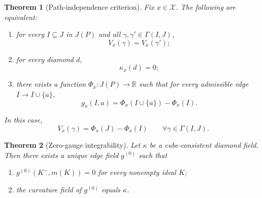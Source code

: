\documentclass[10pt,a4paper]{amsart}
\newtheorem{theorem}{Theorem}
\newcommand{\RR}{\mathbb R}
\begin{document}
\begin{theorem}[Path-independence criterion]
\label{thm:path-independence-main}
Fix \(x\in\mathcal X\). The following are equivalent:
\begin{enumerate}
    \item for every \(I\subseteq J\) in \(J(P)\) and all \(\gamma,\gamma'\in \Gamma(I,J)\),
    \begin{equation}
    V_x(\gamma)=V_x(\gamma');
    \label{eq:path-independence-condition}
    \end{equation}
    \item for every diamond \(d\),
    \begin{equation}
    \kappa_x(d)=0;
    \label{eq:zero-curvature-condition}
    \end{equation}
    \item there exists a function \(\Phi_x:J(P)\to\RR\) such that for every admissible edge \(I\to I\cup\{a\}\),
    \begin{equation}
    g_x(I,a)=\Phi_x(I\cup\{a\})-\Phi_x(I).
    \label{eq:endpoint-potential-gradient}
    \end{equation}
\end{enumerate}
In this case,
\begin{equation}
V_x(\gamma)=\Phi_x(J)-\Phi_x(I)
\qquad
\forall \gamma\in \Gamma(I,J).
\label{eq:path-independence-telescoping}
\end{equation}
\end{theorem}

\begin{theorem}[Zero-gauge integrability]
\label{thm:zero-gauge-app}
Let \(\kappa\) be a cube-consistent diamond field. Then there exists a unique edge field \(g^{(0)}\) such that
\begin{enumerate}
    \item \(g^{(0)}(K^-,m(K))=0\) for every nonempty ideal \(K\);
    \item the curvature field of \(g^{(0)}\) equals \(\kappa\).
\end{enumerate}
\end{theorem}
\end{document}
